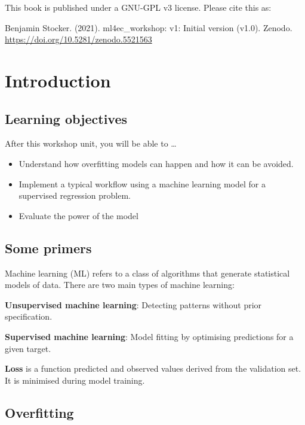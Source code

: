 \documentclass[
]{book}
\providecommand{\tightlist}{%
  \setlength{\itemsep}{0pt}\setlength{\parskip}{0pt}}
\begin{document}
This book is published under a GNU-GPL v3 license. Please cite this as:

Benjamin Stocker. (2021). ml4ec\_workshop: v1: Initial version (v1.0). Zenodo. \url{https://doi.org/10.5281/zenodo.5521563}

\hypertarget{introduction}{%
\chapter{Introduction}\label{introduction}}

\hypertarget{learning-objectives}{%
\section{Learning objectives}\label{learning-objectives}}

After this workshop unit, you will be able to \ldots{}

\begin{itemize}
\tightlist
\item
  Understand how overfitting models can happen and how it can be avoided.
\item
  Implement a typical workflow using a machine learning model for a supervised regression problem.
\item
  Evaluate the power of the model
\end{itemize}

\hypertarget{some-primers}{%
\section{Some primers}\label{some-primers}}

Machine learning (ML) refers to a class of algorithms that generate statistical models of data. There are two main types of machine learning:

\textbf{Unsupervised machine learning}: Detecting patterns without prior specification.

\textbf{Supervised machine learning}: Model fitting by optimising predictions for a given target.

\textbf{Loss} is a function predicted and observed values derived from the validation set. It is minimised during model training.

\hypertarget{overfitting}{%
\section{Overfitting}\label{overfitting}}
\end{document}
